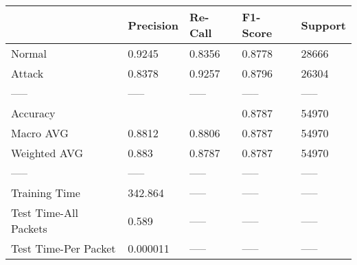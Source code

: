 \begin{tabular}{lllll}
\toprule
{} & Precision & Re-Call & F1-Score & Support \\
\midrule
Normal                &    0.9245 &  0.8356 &   0.8778 &   28666 \\
Attack                &    0.8378 &  0.9257 &   0.8796 &   26304 \\
-----                 &     ----- &   ----- &    ----- &   ----- \\
Accuracy              &           &         &   0.8787 &   54970 \\
Macro AVG             &    0.8812 &  0.8806 &   0.8787 &   54970 \\
Weighted AVG          &     0.883 &  0.8787 &   0.8787 &   54970 \\
-----                 &     ----- &   ----- &    ----- &   ----- \\
Training Time         &   342.864 &   ----- &    ----- &   ----- \\
Test Time-All Packets &     0.589 &   ----- &    ----- &   ----- \\
Test Time-Per Packet  &  0.000011 &   ----- &    ----- &   ----- \\
\bottomrule
\end{tabular}
